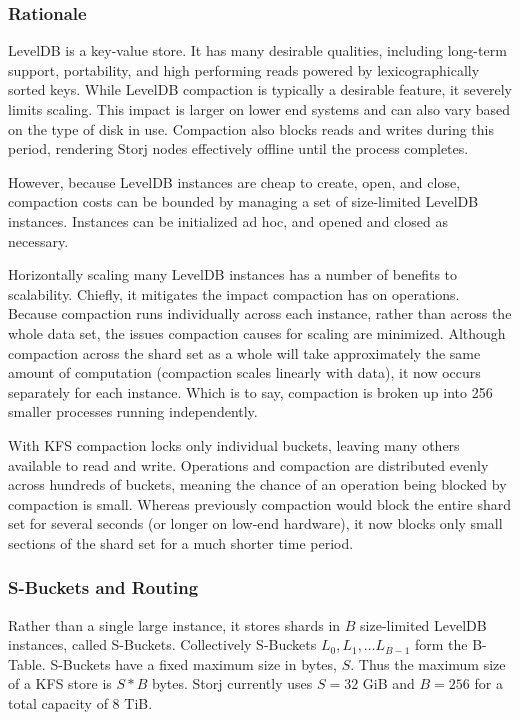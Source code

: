 \documentclass[a4paper,10pt]{article}
\begin{document}
\subsubsection{Rationale}
LevelDB is a key-value store. It has many desirable qualities, including long-term support, portability, and high performing reads powered by lexicographically sorted keys. While LevelDB compaction is typically a desirable feature, it severely limits scaling. This impact is larger on lower end systems and can also vary based on the type of disk in use. Compaction also blocks reads and writes during this period, rendering Storj nodes effectively offline until the process completes.

However, because LevelDB instances are cheap to create, open, and close, compaction costs can be bounded by managing a set of size-limited LevelDB instances. Instances can be initialized ad hoc, and opened and closed as necessary.

Horizontally scaling many LevelDB instances has a number of benefits to scalability. Chiefly, it mitigates the impact compaction has on operations. Because compaction runs individually across each instance, rather than across the whole data set, the issues compaction causes for scaling are minimized. Although compaction across the shard set as a whole will take approximately the same amount of computation (compaction scales linearly with data), it now occurs separately for each instance. Which is to say, compaction is broken up into 256 smaller processes running independently.

With KFS compaction locks only individual buckets, leaving many others available to read and write. Operations and compaction are distributed evenly across hundreds of buckets, meaning the chance of an operation being blocked by compaction is small. Whereas previously compaction would block the entire shard set for several seconds (or longer on low-end hardware), it now blocks only small sections of the shard set for a much shorter time period.

\subsubsection{S-Buckets and Routing}
Rather than a single large instance, it stores shards in $ B $ size-limited LevelDB instances, called S-Buckets. Collectively S-Buckets $ L_{0} , L_{1} , … L_{B-1} $ form the B-Table. S-Buckets have a fixed maximum size in bytes, $ S $. Thus the maximum size of a KFS store is $ S * B $ bytes. Storj currently uses $ S = 32 $ GiB and $ B = 256 $ for a total capacity of 8 TiB.
\end{document}
